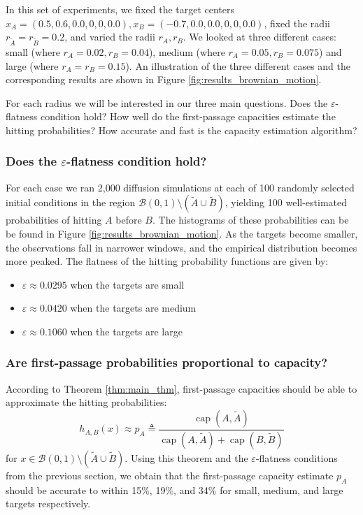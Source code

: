 \documentclass[12pt, nofootinbib,english, amsmath, amssymb, aps, priprint, graphicx,floatfix,draft]{revtex4-1}
\theoremstyle{plain}
\theoremstyle{definition}
\theoremstyle{plain}
\newcommand{\capac}[2]{\ensuremath{\operatorname{cap}}(#1,#2)}
\newcommand{\tA}{{\tilde A}}
\newcommand{\tB}{{\tilde B}}
\begin{document}
In this set of experiments, we fixed the target centers $x_A=(0.5,0.6,0.0,0,0,0.0), x_B=(-0.7,0.0,0.0,0,0,0.0)$, fixed the radii $r_\tA=r_\tB=0.2$, and varied the radii $r_A,r_B$.  We looked at three different cases: small (where $r_A=0.02, r_B=0.04$), medium (where $r_A=0.05, r_B=0.075$) and large (where $r_A=r_B=0.15$). An illustration of the three different cases and the corresponding results are shown in Figure \ref{fig:results_brownian_motion}.  

For each radius we will be interested in our three main questions.  Does the $\varepsilon$-flatness condition hold?  How well do the first-passage capacities estimate the hitting probabilities?  How accurate and fast is the capacity estimation algorithm?

\subsubsection{Does the $\varepsilon$-flatness condition hold?}
\label{sec:toy_constant}
For each case we ran 2,000 diffusion simulations at each of 100 randomly selected initial conditions in the region $\mathcal{B}(0, 1) \setminus (\tilde{A} \cup \tilde{B})$, yielding 100 well-estimated probabilities of hitting $A$ before $B$. The histograms of these probabilities can be be found in Figure \ref{fig:results_brownian_motion}. As the targets become smaller, the observations fall in narrower windows, and the empirical distribution becomes more peaked. The flatness of the hitting probability functions are given by:
\begin{itemize}
    \item $\varepsilon\approx 0.0295$ when the targets are small
    \item $\varepsilon\approx 0.0420$ when the targets are medium
    \item $\varepsilon\approx 0.1060$ when the targets are large
\end{itemize}

\subsubsection{Are first-passage probabilities proportional to capacity?}
\label{sec:toy_capacity}
According to Theorem \ref{thm:main_thm}, first-passage capacities should be able to approximate the hitting probabilities:
\begin{equation}
\label{eqn:capacity_ratio}
h_{A,B}(x) \approx p_A \triangleq \frac{\capac{A}{\tA}}{\capac{A}{\tA}+\capac{B}{\tB}}
\end{equation}
for $x\in\mathcal{B}(0, 1) \setminus (\tilde{A} \cup \tilde{B})$.  Using this theorem and the $\varepsilon$-flatness conditions from the previous section, we obtain that the first-passage capacity estimate $p_A$ should be accurate to within 15\%, 19\%, and 34\% for small, medium, and large targets respectively.  
\end{document}
